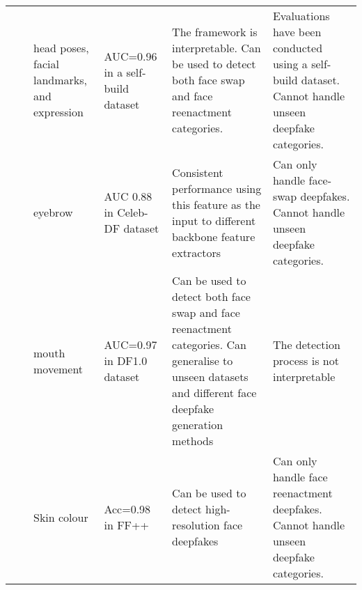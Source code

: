 \begin{table*}[htbp]
{\begin{tabular}{|p{2cm}|p{1cm}|p{5cm}|p{3cm}|p{5cm}|p{5cm}|}
                                   & \cite{agarwal2019protecting}        & head poses, facial landmarks, and expression                                                                           & AUC=0.96 in a self-build dataset                                            & The framework is interpretable. Can be used to detect both face swap and face reenactment categories.                                                                                                                                       & Evaluations have been conducted using a self-build dataset. Cannot handle unseen deepfake categories. \\ \cline{2-6} 
                                   & \cite{nguyen2020eyebrow}            & eyebrow                                                                                                                & AUC 0.88 in Celeb-DF dataset \cite{Celeb_DF_cvpr20}                        & Consistent performance using this feature as the input to different backbone feature extractors                                                                                                                                             & Can only handle face-swap deepfakes. Cannot handle unseen deepfake categories.                        \\ \cline{2-6} 
                                   & \cite{haliassos2021lips}            & mouth movement                                                                                                         & AUC=0.97 in DF1.0 \cite{jiang2020deeperforensics} dataset                          & Can be used to detect both face swap and face reenactment categories. Can generalise to unseen datasets and different face deepfake generation methods                                                                                      & The detection process is not interpretable                                                            \\ \cline{2-6} 
                                   & \cite{qi2020deeprhythm}             & Skin colour                                                                                                            & Acc=0.98 in FF++ \cite{rossler2019faceforensics++}                                   & Can be used to detect high-resolution face deepfakes                                                                                                                                                                                        & Can only handle face reenactment deepfakes. Cannot handle unseen deepfake categories.                 \\ \cline{2-6} 

\end{tabular}}
\end{table*}
